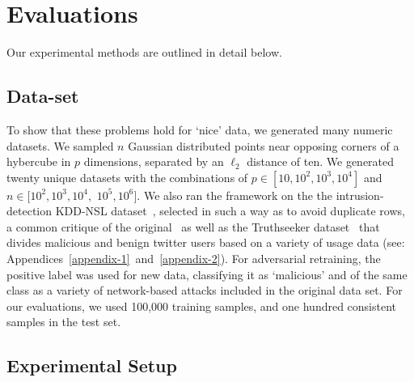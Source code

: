 \documentclass[fonts]{icst}
\begin{document}
\section{Evaluations}
Our experimental methods are outlined in detail below.
\subsection{Data-set}
To show that these problems hold for `nice' data, we generated many numeric datasets.
We sampled $n$ Gaussian distributed points near opposing corners of a hybercube in $p$ dimensions, separated by an $\ell_2$ distance of ten.
We generated twenty unique datasets with the combinations of $p \in [10, 10^{2}, 10^{3}, 10^{4}]$ and $n \in [10^2, 10^3, 10^4,$ $10^5, 10^6]$.
We also ran the framework on the the intrusion-detection KDD-NSL dataset~\cite{kdd-nsl}, selected in such a way as to avoid duplicate rows, a common critique of the original~\cite{Dua:2019} as well as the Truthseeker dataset~\cite{truthseeker} that divides malicious and benign twitter users based on a variety of usage data (see: Appendices~\ref{appendix-1}~and~\ref{appendix-2}).
For adversarial retraining, the positive label was used for new data, classifying it as `malicious' and of the same class as a variety of network-based attacks included in the original data set.
For our evaluations, we used 100,000 training samples, and one hundred consistent samples in the test set.




\subsection{Experimental Setup}
\end{document}
